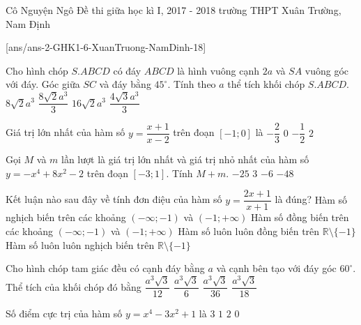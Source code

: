 
\begin{name}
{Cô Nguyện Ngô}
{Đề thi giữa học kì I, 2017 - 2018 trường THPT Xuân Trường, Nam Định}
\end{name}
\setcounter{ex}{0}
[ans/ans-2-GHK1-6-XuanTruong-NamDinh-18]

\begin{ex}%
Cho hình chóp $S.ABCD$ có đáy $ABCD$ là hình vuông cạnh $2a$ và $SA$ vuông góc với đáy. Góc giữa $SC$ và đáy bằng $45^\circ$. Tính theo $a$ thể tích khối chóp $S.ABCD$.
\choice
{$8\sqrt{2}a^3$}
{\True $\dfrac{8\sqrt{2}a^3}{3}$}
{$16\sqrt{2}a^3$}
{$\dfrac{4\sqrt{3}a^3}{3}$}
\end{ex}

\begin{ex}%
Giá trị lớn nhất của hàm số $y=\dfrac{x+1}{x-2}$ trên đoạn $[-1; 0]$ là
\choice
{$-\dfrac{2}{3}$}
{\True $0$}
{$-\dfrac{1}{2}$}
{$2$}
\end{ex}

\begin{ex}%
Gọi $M$ và $m$ lần lượt là giá trị lớn nhất và giá trị nhỏ nhất của hàm số $y=-x^4+8x^2-2$ trên đoạn $[-3; 1]$. Tính $M+m$.
\choice
{$-25$}
{\True $3$}
{$-6$}
{$-48$}
\end{ex}

\begin{ex}%
Kết luận nào sau đây về tính đơn điệu của hàm số $y=\dfrac{2x+1}{x+1}$ là đúng?
\choice
{Hàm số nghịch biến trên các khoảng $(-\infty; -1)$ và $(-1; +\infty)$}
{\True Hàm số đồng biến trên các khoảng $(-\infty; -1)$ và $(-1; +\infty)$}
{Hàm số luôn luôn đồng biến trên $\mathbb{R}\setminus \{-1\}$ }
{Hàm số luôn luôn nghịch biến trên $\mathbb{R}\setminus \{-1\}$}
\end{ex}

\begin{ex}%
Cho hình chóp tam giác đều có cạnh đáy bằng $a$ và cạnh bên tạo với đáy góc $60^\circ$. Thể tích của khối chóp đó bằng
\choice
{\True $\dfrac{a^3\sqrt{3}}{12}$}
{$\dfrac{a^3\sqrt{3}}{6}$}
{$\dfrac{a^3\sqrt{3}}{36}$}
{$\dfrac{a^3\sqrt{3}}{18}$}
\end{ex}

\begin{ex}%
Số điểm cực trị của hàm số $y=x^4-3x^2+1$ là
\choice
{\True $3$}
{$1$}
{$2$}
{$0$}
\end{ex}

